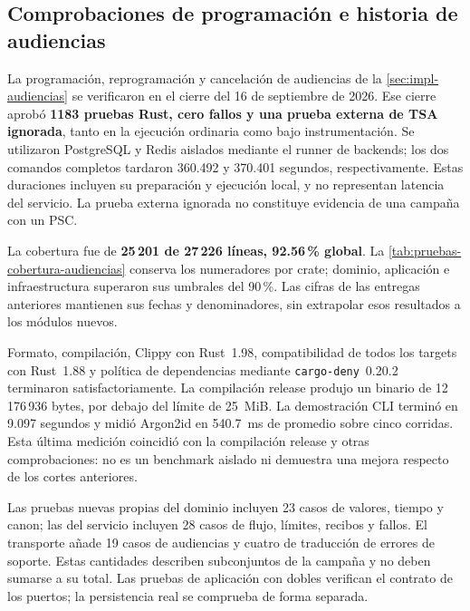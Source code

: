 \subsection{Comprobaciones de programación e historia de audiencias}\label{sec:pruebas-audiencias}

La programación, reprogramación y cancelación de audiencias de la \cref{sec:impl-audiencias} se verificaron en el cierre del 16 de septiembre de 2026. Ese cierre aprobó \textbf{1183 pruebas Rust, cero fallos y una prueba externa de TSA ignorada}, tanto en la ejecución ordinaria como bajo instrumentación. Se utilizaron PostgreSQL y Redis aislados mediante el runner de backends; los dos comandos completos tardaron 360.492 y 370.401 segundos, respectivamente. Estas duraciones incluyen su preparación y ejecución local, y no representan latencia del servicio. La prueba externa ignorada no constituye evidencia de una campaña con un PSC.

La cobertura fue de \textbf{25\,201 de 27\,226 líneas, 92.56\,\% global}. La \cref{tab:pruebas-cobertura-audiencias} conserva los numeradores por crate; dominio, aplicación e infraestructura superaron sus umbrales del 90\,\%. Las cifras de las entregas anteriores mantienen sus fechas y denominadores, sin extrapolar esos resultados a los módulos nuevos.

Formato, compilación, Clippy con Rust~1.98, compatibilidad de todos los targets con Rust~1.88 y política de dependencias mediante \texttt{cargo-deny}~0.20.2 terminaron satisfactoriamente. La compilación release produjo un binario de 12\,176\,936 bytes, por debajo del límite de 25~MiB. La demostración CLI terminó en 9.097 segundos y midió Argon2id en 540.7~ms de promedio sobre cinco corridas. Esta última medición coincidió con la compilación release y otras comprobaciones: no es un benchmark aislado ni demuestra una mejora respecto de los cortes anteriores.

Las pruebas nuevas propias del dominio incluyen 23 casos de valores, tiempo y canon; las del servicio incluyen 28 casos de flujo, límites, recibos y fallos. El transporte añade 19 casos de audiencias y cuatro de traducción de errores de soporte. Estas cantidades describen subconjuntos de la campaña y no deben sumarse a su total. Las pruebas de aplicación con dobles verifican el contrato de los puertos; la persistencia real se comprueba de forma separada.

